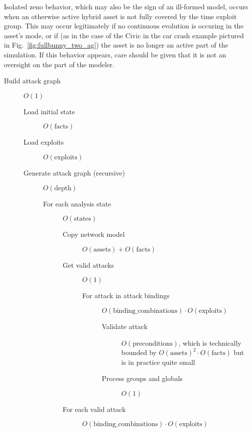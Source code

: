 Isolated zeno behavior, which may also be the sign of an ill-formed model, 
occurs when an otherwise active hybrid asset is not fully covered by the time
exploit group. This may occur legitimately if no continuous evolution is
occuring in the asset's mode, or if (as in the case of the Civic in the
car crash example pictured in Fig.~\ref{fig:fullbunny_two_ag}) the asset is
no longer an active part of the simulation. If this behavior appears, care 
should be given that it is not an oversight on the part of the modeler.
\begin{description}
    \item[Build attack graph] $O(1)$
    \begin{description}
        \item[Load initial state] $O(\text{facts})$
        \item[Load exploits] $O(\text{exploits})$
        \item[Generate attack graph (recursive)] $O(\text{depth})$
        \begin{description}
            \item[For each analysis state] $O(\text{states})$
            \begin{description}
                \item[Copy network model] $O(\text{assets}) + O(\text{facts})$
                \item[Get valid attacks] $O(1)$
                \begin{description}
                    \item[For attack in attack bindings] $O(\text{binding\_combinations}) \cdot O(\text{exploits})$
                    \begin{description}
                        \item[Validate attack] $O(\text{preconditions})$, which is
                            technically bounded by $O(\text{assets})^2 \cdot O(\text{facts})$
                            but is in practice quite small
                        \item[Process groups and globals] $O(1)$
                    \end{description}
                \end{description}
                \item[For each valid attack] $O(\text{binding\_combinations}) \cdot O(\text{exploits})$
                \begin{description}

\end{description}
\end{description}
\end{description}
\end{description}
\end{description}
